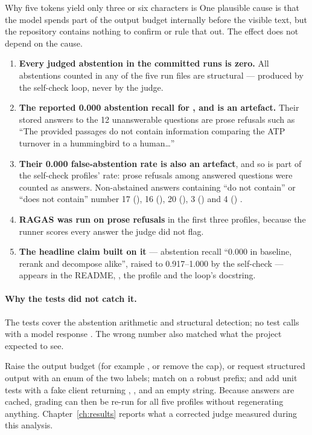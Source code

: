 Why five tokens yield only three or six characters is \NotDet{} One plausible cause is that the model spends part of the output budget internally before the visible text, but the repository contains nothing to confirm or rule that out. The effect does not depend on the cause.

\begin{keyidea}[consequences]
\begin{enumerate}
  \item \textbf{Every judged abstention in the committed runs is zero.} All abstentions counted in any of the five run files are structural --- produced by the self-check loop, never by the judge.
  \item \textbf{The reported 0.000 abstention recall for ,  and  is an artefact.} Their stored answers to the 12 unanswerable questions are prose refusals such as \enquote{The provided passages do not contain information comparing the ATP turnover in a hummingbird to a human\ldots}
  \item \textbf{Their 0.000 false-abstention rate is also an artefact}, and so is part of the self-check profiles' rate: prose refusals among answered questions were counted as answers. Non-abstained answers containing \enquote{do not contain} or \enquote{does not contain} number 17 (), 16 (), 20 (), 3 () and 4 () \tagM.
  \item \textbf{RAGAS was run on prose refusals} in the first three profiles, because the runner scores every answer the judge did not flag.
  \item \textbf{The headline claim built on it} --- abstention recall \enquote{0.000 in baseline, rerank and decompose alike}, raised to 0.917--1.000 by the self-check --- appears in the README, , the  profile and the loop's docstring.
\end{enumerate}
\end{keyidea}

\paragraph{Why the tests did not catch it.} The tests cover the abstention arithmetic and structural detection; no test calls  with a model response \tagV. The wrong number also matched what the project expected to see.

\begin{recommended}
Raise the output budget (for example , or remove the cap), or request structured output with an enum of the two labels; match on a robust prefix; and add unit tests with a fake client returning , ,  and an empty string. Because answers are cached, grading can then be re-run for all five profiles without regenerating anything. Chapter~\ref{ch:results} reports what a corrected judge measured during this analysis.
\end{recommended}

